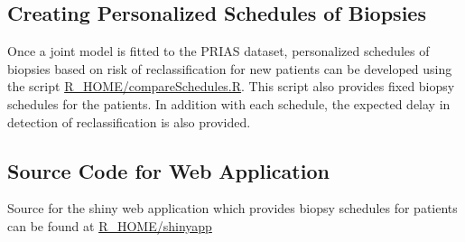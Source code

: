 \subsection{Creating Personalized Schedules of Biopsies}
Once a joint model is fitted to the PRIAS dataset, personalized schedules of biopsies based on risk of reclassification for new patients can be developed using the script \url{R_HOME/compareSchedules.R}. This script also provides fixed biopsy schedules for the patients. In addition with each schedule, the expected delay in detection of reclassification is also provided.

\subsection{Source Code for Web Application}
Source for the shiny web application which provides biopsy schedules for patients can be found at \url{R_HOME/shinyapp}
